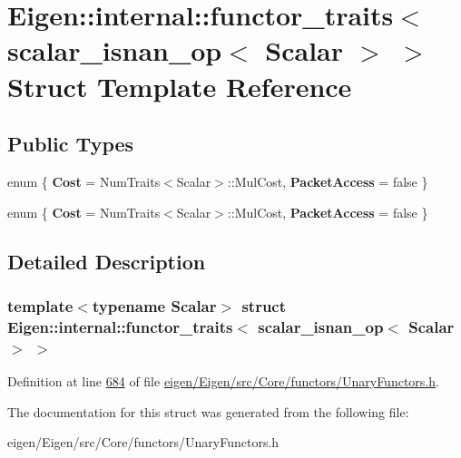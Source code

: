 \hypertarget{struct_eigen_1_1internal_1_1functor__traits_3_01scalar__isnan__op_3_01_scalar_01_4_01_4}{}\section{Eigen\+:\+:internal\+:\+:functor\+\_\+traits$<$ scalar\+\_\+isnan\+\_\+op$<$ Scalar $>$ $>$ Struct Template Reference}
\label{struct_eigen_1_1internal_1_1functor__traits_3_01scalar__isnan__op_3_01_scalar_01_4_01_4}
\subsection*{Public Types}
\begin{DoxyCompactItemize}
\item 
\mbox{\label{struct_eigen_1_1internal_1_1functor__traits_3_01scalar__isnan__op_3_01_scalar_01_4_01_4_a3d58988b6b9407025fcd02a9c86ed248}} 
enum \{ {\bfseries Cost} = Num\+Traits$<$Scalar$>$\+:\+:Mul\+Cost, 
{\bfseries Packet\+Access} = false
 \}
\item 
\mbox{\label{struct_eigen_1_1internal_1_1functor__traits_3_01scalar__isnan__op_3_01_scalar_01_4_01_4_a833bbb778242492b290a7b20ba511f7c}} 
enum \{ {\bfseries Cost} = Num\+Traits$<$Scalar$>$\+:\+:Mul\+Cost, 
{\bfseries Packet\+Access} = false
 \}
\end{DoxyCompactItemize}


\subsection{Detailed Description}
\subsubsection*{template$<$typename Scalar$>$\newline
struct Eigen\+::internal\+::functor\+\_\+traits$<$ scalar\+\_\+isnan\+\_\+op$<$ Scalar $>$ $>$}



Definition at line \hyperlink{eigen_2_eigen_2src_2_core_2functors_2_unary_functors_8h_source_l00684}{684} of file \hyperlink{eigen_2_eigen_2src_2_core_2functors_2_unary_functors_8h_source}{eigen/\+Eigen/src/\+Core/functors/\+Unary\+Functors.\+h}.



The documentation for this struct was generated from the following file\+:\begin{DoxyCompactItemize}
\item 
eigen/\+Eigen/src/\+Core/functors/\+Unary\+Functors.\+h\end{DoxyCompactItemize}
